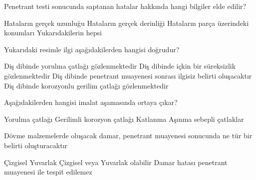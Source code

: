 \begin{question}[subtitle=]
  Penetrant testi sonucunda saptanan hatalar hakkında hangi bilgiler elde edilir?
  \begin{tasks}
    \task Hataların gerçek uzunluğu
    \task Hataların gerçek derinliği
    \task Hataların parça üzerindeki konumları \correct
    \task Yukarıdakilerin hepsi
  \end{tasks}
\end{question}
\begin{solution}
	\correct
\end{solution}

\begin{question}[subtitle=]
    	\begin{figure}[!htb]
		\centering
	\end{figure}

        Yukarıdaki resimle ilgi aşağıdakilerden hangisi doğrudur?
	\begin{tasks}
          \task Diş dibinde yorulma çatlağı gözlenmektedir \correct
          \task Diş dibinde içkin bir süreksizlik gözlenmektedir
          \task Diş dibinde penetrant muayenesi sonrası ilgisiz belirti oluşacaktır
          \task Diş dibinde korozyonlu gerilim çatlağı gözlenmektedir
	\end{tasks}
\end{question}
\begin{solution}
	\correct
\end{solution}

\begin{question}[subtitle=]
  Aşağıdakilerden hangisi imalat aşamasında ortaya çıkar?
  \begin{tasks}
    \task Yorulma çatlağı
    \task Gerilimli korozyon çatlağı
    \task Katlanma \correct
    \task Aşınma sebepli çatlaklar
  \end{tasks}
\end{question}
\begin{solution}
	\correct
\end{solution}

\begin{question}[subtitle=]
  Dövme malzemelerde oluşacak damar, penetrant muayenesi sonucunda ne tür bir belirti oluşturacaktır
  \begin{tasks}
    \task Çizgisel \correct
    \task Yuvarlak
    \task Çizgisel veya Yuvarlak olabilir
    \task Damar hatası penetrant muayenesi ile tespit edilemez
  \end{tasks}
\end{question}
\begin{solution}
	\correct
\end{solution}

